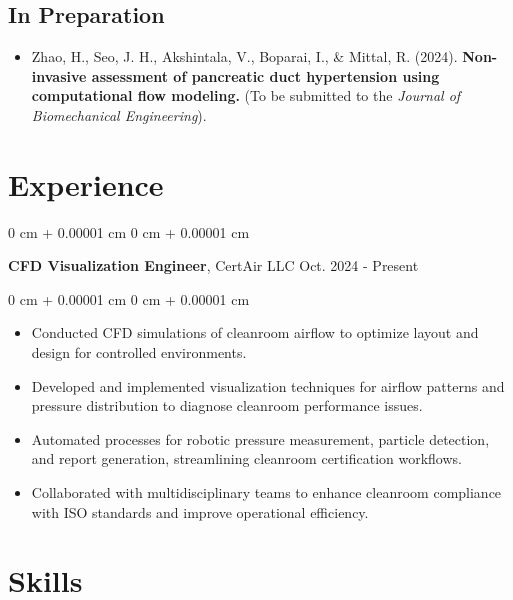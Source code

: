 \documentclass[10pt, letterpaper]{article}
\newenvironment{highlights}{
    \begin{itemize}[
        topsep=0.10 cm,
        parsep=0.10 cm,
        partopsep=0pt,
        itemsep=0pt,
        leftmargin=0 cm + 10pt
    ]
}{
    \end{itemize}
} %
\newenvironment{onecolentry}{
    \begin{adjustwidth}{
        0 cm + 0.00001 cm
    }{
        0 cm + 0.00001 cm
    }
}{
    \end{adjustwidth}
} %
\newenvironment{twocolentry}[2][]{
    \onecolentry
    \def\secondColumn{#2}
    \setcolumnwidth{\fill, 4.5 cm}
    \begin{paracol}{2}
}{ 
    \switchcolumn \raggedleft \secondColumn
    \end{paracol}
    \endonecolentry
} %
\begin{document}
    \subsection*{In Preparation}
    \begin{itemize}[leftmargin=*, itemsep=0pt]
        \item Zhao, H., Seo, J. H., Akshintala, V., Boparai, I., \& Mittal, R. (2024). \textbf{Non-invasive assessment of pancreatic duct hypertension using computational flow modeling.} (To be submitted to the \textit{Journal of Biomechanical Engineering}).
    \end{itemize}




    \section{Experience}
        \begin{twocolentry}{
            Oct. 2024 - Present
        }
            \textbf{CFD Visualization Engineer}, CertAir LLC\end{twocolentry}

        \vspace{0.10 cm}
        \begin{onecolentry}
            \begin{highlights}
                \item Conducted CFD simulations of cleanroom airflow to optimize layout and design for controlled environments.
                \item Developed and implemented visualization techniques for airflow patterns and pressure distribution to diagnose cleanroom performance issues.
                \item Automated processes for robotic pressure measurement, particle detection, and report generation, streamlining cleanroom certification workflows.
                \item Collaborated with multidisciplinary teams to enhance cleanroom compliance with ISO standards and improve operational efficiency.
            \end{highlights}
        \end{onecolentry}

        \vspace{0.2 cm}

    \section{Skills}
\end{document}

